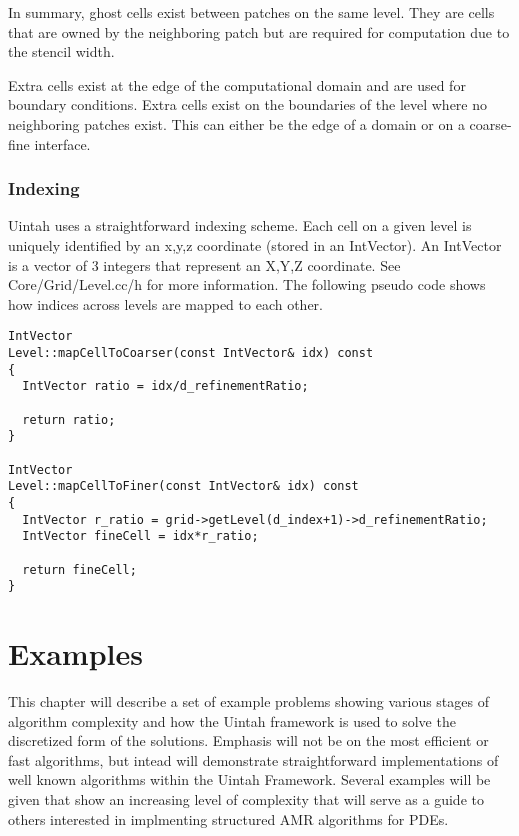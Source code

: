 \documentclass[11pt,fleqn]{book} %
\begin{document}
In summary, ghost cells exist between patches on the same level.  They are cells that are owned by the neighboring patch but are required for computation due to the stencil width.

Extra cells exist at the edge of the computational domain and are used for boundary conditions.  Extra cells exist on the boundaries of the level where no neighboring patches exist. This can either be the edge of a domain or on a coarse-fine interface.

\subsection{Indexing}

Uintah uses a straightforward indexing scheme. Each cell on a given level is uniquely identified by an x,y,z coordinate (stored in an IntVector).  An IntVector is a vector of 3 integers that represent an X,Y,Z coordinate.  See Core/Grid/Level.cc/h for more information.  The following pseudo code shows how indices across levels are mapped to each other.

\begin{verbatim}
IntVector
Level::mapCellToCoarser(const IntVector& idx) const
{ 
  IntVector ratio = idx/d_refinementRatio;
  
  return ratio;
}

IntVector
Level::mapCellToFiner(const IntVector& idx) const
{
  IntVector r_ratio = grid->getLevel(d_index+1)->d_refinementRatio;
  IntVector fineCell = idx*r_ratio;

  return fineCell;
}
\end{verbatim}






\chapter{Examples}


This chapter will describe a set of example problems showing various
stages of algorithm complexity and how the Uintah framework is used to
solve the discretized form of the solutions.  Emphasis will not be on
the most efficient or fast algorithms, but intead will demonstrate
straightforward implementations of well known algorithms within the
Uintah Framework.  Several examples will be given that show an
increasing level of complexity that will serve as a guide to others
interested in implmenting structured AMR algorithms for PDEs.
\end{document}
